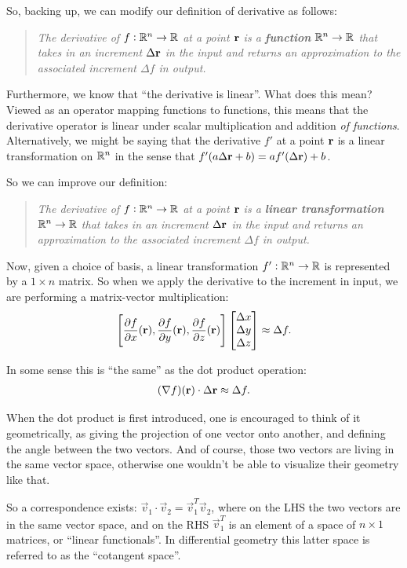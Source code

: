 So, backing up, we can modify our definition of derivative as follows:
\begin{quote}
  \emph{
    The derivative of $f:\mathbb{R}^n \to \mathbb{R}$ at a point $\mathbf{r}$ is a \textbf{function} $\mathbb{R}^n \to \mathbb{R}$ that takes in an increment
    $\Delta \mathbf{r}$ in the input and returns an approximation to the associated increment $\Delta f$ in output.
  }
\end{quote}

Furthermore, we know that ``the derivative is linear''. What does this mean? Viewed as an operator
mapping functions to functions, this means that the derivative operator is linear under scalar
multiplication and addition \emph{of functions}. Alternatively, we might be saying that the
derivative $f'$ at a point $\mathbf{r}$ is a linear transformation on $\mathbb{R}^n$ in the sense that
$f'(a\Delta \mathbf{r} + b) = af'(\Delta\mathbf{r}) + b$.

So we can improve our definition:
\begin{quote}
  \emph{
    The derivative of $f:\mathbb{R}^n \to \mathbb{R}$ at a point $\mathbf{r}$ is a \textbf{linear transformation}
    $\mathbb{R}^n \to \mathbb{R}$ that takes in an increment $\Delta \mathbf{r}$ in the input and returns an approximation to the
    associated increment $\Delta f$ in output.
  }
\end{quote}

Now, given a choice of basis, a linear transformation $f':\mathbb{R}^n \to \mathbb{R}$ is represented by a
$1 \times n$ matrix. So when we apply the derivative to the increment in input, we are performing a
matrix-vector multiplication:
\begin{align*}
  \Bigg[\frac{\partial f}{\partial x}(\mathbf{r}), \frac{\partial f}{\partial y}(\mathbf{r}), \frac{\partial f}{\partial z}(\mathbf{r})\Bigg] \begin{bmatrix}\Delta x\\\Delta y\\\Delta z\end{bmatrix} \approx \Delta f.
\end{align*}

In some sense this is ``the same'' as the dot product operation:
\begin{align*}
  (\nabla f)(\mathbf{r}) \cdot \Delta\mathbf{r} \approx \Delta f.
\end{align*}

When the dot product is first introduced, one is encouraged to think of it geometrically, as giving
the projection of one vector onto another, and defining the angle between the two vectors. And of
course, those two vectors are living in the same vector space, otherwise one wouldn't be able to
visualize their geometry like that.

So a correspondence exists: $\vec v_1 \cdot \vec v_2 = \vec v_1^T \vec v_2$, where on the LHS the two
vectors are in the same vector space, and on the RHS $\vec v_1^T$ is an element of a space of
$n \times 1$ matrices, or ``linear functionals''. In differential geometry this latter space is referred
to as the ``cotangent space''.


